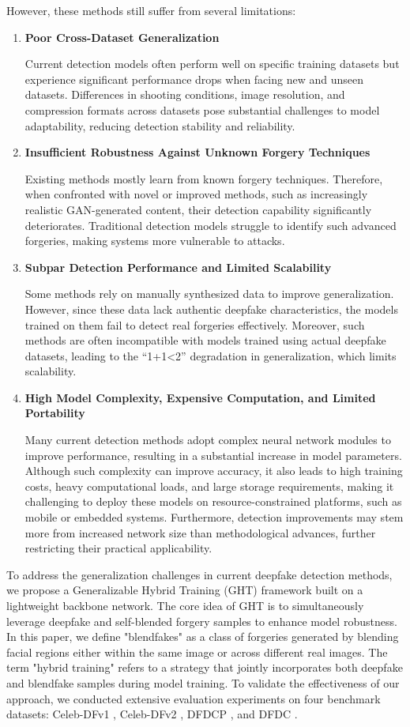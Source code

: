 \documentclass[final,5p,times]{elsarticle}
\begin{document}
However, these methods still suffer from several limitations:
\begin{enumerate}
    \item \textbf{Poor Cross-Dataset Generalization}

    Current detection models often perform well on specific training datasets but experience significant performance drops when facing new and unseen datasets. Differences in shooting conditions, image resolution, and compression formats across datasets pose substantial challenges to model adaptability, reducing detection stability and reliability.
    \item \textbf{Insufficient Robustness Against Unknown Forgery Techniques}

    Existing methods mostly learn from known forgery techniques. Therefore, when confronted with novel or improved methods, such as increasingly realistic GAN-generated content, their detection capability significantly deteriorates. Traditional detection models struggle to identify such advanced forgeries, making systems more vulnerable to attacks.
    \item \textbf{Subpar Detection Performance and Limited Scalability}

    Some methods \cite{14,15,16,17,18} rely on manually synthesized data to improve generalization. However, since these data lack authentic deepfake characteristics, the models trained on them fail to detect real forgeries effectively. Moreover, such methods are often incompatible with models trained using actual deepfake datasets, leading to the “1+1\textless2” degradation in generalization, which limits scalability.
    \item \textbf{High Model Complexity, Expensive Computation, and Limited Portability}

    Many current detection methods adopt complex neural network modules to improve performance, resulting in a substantial increase in model parameters. Although such complexity can improve accuracy, it also leads to high training costs, heavy computational loads, and large storage requirements, making it challenging to deploy these models on resource-constrained platforms, such as mobile or embedded systems. Furthermore, detection improvements may stem more from increased network size than methodological advances, further restricting their practical applicability.
\end{enumerate}

To address the generalization challenges in current deepfake detection methods, we propose a Generalizable Hybrid Training (GHT) framework built on a lightweight backbone network. The core idea of GHT is to simultaneously leverage deepfake and self-blended forgery samples to enhance model robustness.
In this paper, we define "blendfakes" as a class of forgeries generated by blending facial regions either within the same image or across different real images. The term "hybrid training" refers to a strategy that jointly incorporates both deepfake and blendfake samples during model training.
To validate the effectiveness of our approach, we conducted extensive evaluation experiments on four benchmark datasets: Celeb-DFv1 \cite{19}, Celeb-DFv2 \cite{19}, DFDCP \cite{20}, and DFDC \cite{21}.
\end{document}
